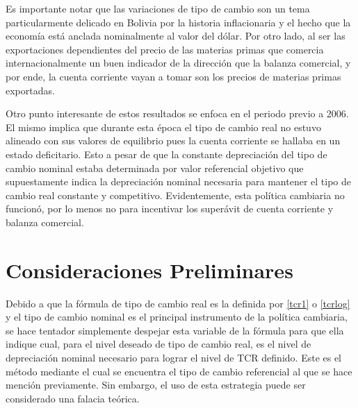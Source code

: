 \documentclass[12pt,letterpaper]{article}
\begin{document}
Es importante notar que las variaciones de tipo de cambio son un tema particularmente delicado en Bolivia por la historia inflacionaria y el hecho que la economía está anclada nominalmente al valor del dólar. Por otro lado, al ser las exportaciones dependientes del precio de las materias primas que comercia internacionalmente un buen indicador de la dirección que la balanza comercial, y por ende, la cuenta corriente vayan a tomar son los precios de materias primas exportadas.

Otro punto interesante de estos resultados se enfoca en el periodo previo a 2006. El mismo implica que durante esta época el tipo de cambio real no estuvo alineado con sus valores de equilibrio pues la cuenta corriente se hallaba en un estado deficitario. Esto a pesar de que la constante depreciación del tipo de cambio nominal estaba determinada por valor referencial objetivo que supuestamente indica la depreciación nominal necesaria para mantener el tipo de cambio real constante y competitivo. Evidentemente, esta política cambiaria no funcionó, por lo menos no para incentivar los superávit de cuenta corriente y balanza comercial.


\section{Consideraciones Preliminares}\label{consid}


Debido a que la fórmula de tipo de cambio real es la definida por \ref{tcr1} o \ref{tcrlog} y el tipo de cambio nominal es el principal instrumento de la política cambiaria, se hace tentador simplemente despejar esta variable de la fórmula para que ella indique cual, para el nivel deseado de tipo de cambio real, es el nivel de depreciación nominal necesario para lograr el nivel de TCR definido. Este es el método mediante el cual se encuentra el tipo de cambio referencial al que se hace mención previamente. Sin embargo, el uso de esta estrategia puede ser considerado una falacia teórica.
\end{document}
